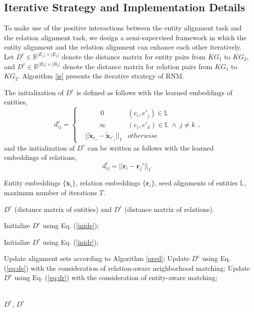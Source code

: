 \documentclass[letterpaper]{article} %
\begin{document}
\subsection{Iterative Strategy and Implementation Details}
To make use of the positive interactions between the entity
alignment task and the relation alignment task, we design a
semi-supervised framework in which the entity alignment and the
relation alignment can enhance each other iteratively. Let $D^e \in
\mathbb{R}^{|E_1| \times |E_2|}$ denote the distance matrix for
entity pairs from $KG_1$ to $KG_2$, and $D^r \in \mathbb{R}^{|R_1|
\times |R_2|}$ denote the distance matrix for relation pairs from
$KG_1$ to $KG_2$. Algorithm \ref{is} presents the iterative
strategy of RNM.

The initialization of $D^e$ is defined as follows with the learned
embeddings of entities,
\begin{equation}
d^e_{ij} = \left\{
\begin{aligned}
&\qquad \  0 & (e_i, e'_j) \in \mathbb{L} \\
& \qquad \infty & (e_i, e'_k) \in \mathbb{L}\ \wedge \  j\neq k \\
& || \tilde{\bm{x}}_{e_i} - \tilde{\bm{x}}_{e'_j} ||_{1}  &
otherwise
\end{aligned}
\right. , \label{inide}
\end{equation}
and the initialization of $D^r$ can be written as follows with the
learned embeddings of relations,
\begin{equation}
d^r_{ij} = || \bm{r}_i - \bm{r}_j' ||_{1}. \label{inidr}
\end{equation}

\begin{algorithm}[H]
\caption{Iterative Strategy of RNM} 
\label{is}
\begin{algorithmic}[1]
\Require Entity embeddings $\{\tilde{\bm{x}}_i\}$, relation
embeddings $\{{\bm{r}}_i\}$, seed alignments of entities
$\mathbb{L}$, maximum number of iterations $T$.

\Ensure $D^e$ (distance matrix of entities) and $D^r$ (distance
matrix of relations).

\State Initialize $D^e$ using Eq. (\ref{inide});

\State Initialize $D^r$ using Eq. (\ref{inidr});

\Repeat

\State Update alignment sets according to
Algorithm \ref{pred};
\State Update $D^e$ using Eq. (\ref{eq:de})
with the consideration of relation-aware neighborhood matching;
\State Update $D^r$ using Eq. (\ref{eq:dr}) with the consideration
of entity-aware matching;

\\
\Return $D^e$, $D^r$
\end{algorithmic}
\end{algorithm}
\end{document}
